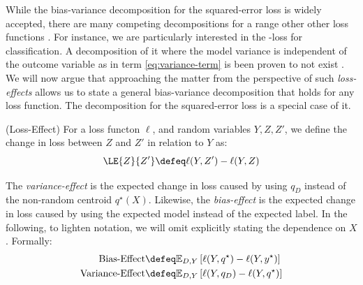 \documentclass[
    a4paper, %
	fontsize=10pt, %
	twoside=false, %
]{kaobook}
\begin{document}
\begin{titlepage}
While the bias-variance decomposition for the squared-error loss is widely accepted, there are many competing decompositions for a range other other loss functions \cite{todo}. For instance, we are particularly interested in the \zeroone-loss for classification. A decomposition of it where the model variance is independent of the outcome variable as in term \ref{eq:variance-term} is been proven to not exist \cite{todo}. We will now argue that approaching the matter from the perspective of such \textit{loss-effects} allows us to state a general bias-variance decomposition that holds for any loss function. The decomposition for the squared-error loss is a special case of it.

\begin{definition} (Loss-Effect) For a loss functon $\ell$, and random variables $Y, Z, Z'$, we define the change in loss between $Z$ and $Z'$ in relation to $Y$ as:
  $$
  \LE{Z}{Z'} \defeq \ell(Y, Z') - \ell(Y, Z)
  $$
  \label{def:loss-effect}
\end{definition}

The \textit{variance-effect} is the expected change in loss caused by using $q_{D}$ instead of the non-random centroid $q^\star(X)$. Likewise, the \textit{bias-effect} is the expected change in loss caused by using the expected model instead of the expected label. In the following, to lighten notation, we will omit explicitly stating the dependence on $X$.
Formally:
\begin{align*}
\text{Bias-Effect} &\defeq \mathbb{E}_{D,Y}\left[ \ell(Y, q^\star) - \ell(Y, y^\star) \right] \\
\text{Variance-Effect} &\defeq \mathbb{E}_{D,Y}\left[ \ell(Y, q_{D}) - \ell(Y, q^\star) \right] 
\end{align*}



\end{titlepage}
\end{document}
